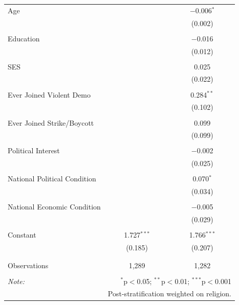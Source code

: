 \begin{table}[!htbp]
\begin{tabular}{@{\extracolsep{5pt}}lcc}
 Age &  & $-$0.006$^{*}$ \\ 
  &  & (0.002) \\ 
  & & \\ 
 Education &  & $-$0.016 \\ 
  &  & (0.012) \\ 
  & & \\ 
 SES &  & 0.025 \\ 
  &  & (0.022) \\ 
  & & \\ 
 Ever Joined Violent Demo &  & 0.284$^{**}$ \\ 
  &  & (0.102) \\ 
  & & \\ 
 Ever Joined Strike/Boycott &  & 0.099 \\ 
  &  & (0.099) \\ 
  & & \\ 
 Political Interest &  & $-$0.002 \\ 
  &  & (0.025) \\ 
  & & \\ 
 National Political Condition &  & 0.070$^{*}$ \\ 
  &  & (0.034) \\ 
  & & \\ 
 National Economic Condition &  & $-$0.005 \\ 
  &  & (0.029) \\ 
  & & \\ 
 Constant & 1.727$^{***}$ & 1.766$^{***}$ \\ 
  & (0.185) & (0.207) \\ 
  & & \\ 
\hline \\[-1.8ex] 
Observations & 1,289 & 1,282 \\ 
\hline 
\hline \\[-1.8ex] 
\textit{Note:}  & \multicolumn{2}{r}{$^{*}$p$<$0.05; $^{**}$p$<$0.01; $^{***}$p$<$0.001} \\ 
 & \multicolumn{2}{r}{Post-stratification weighted on religion.} \\ 
\end{tabular} 
\end{table} 
